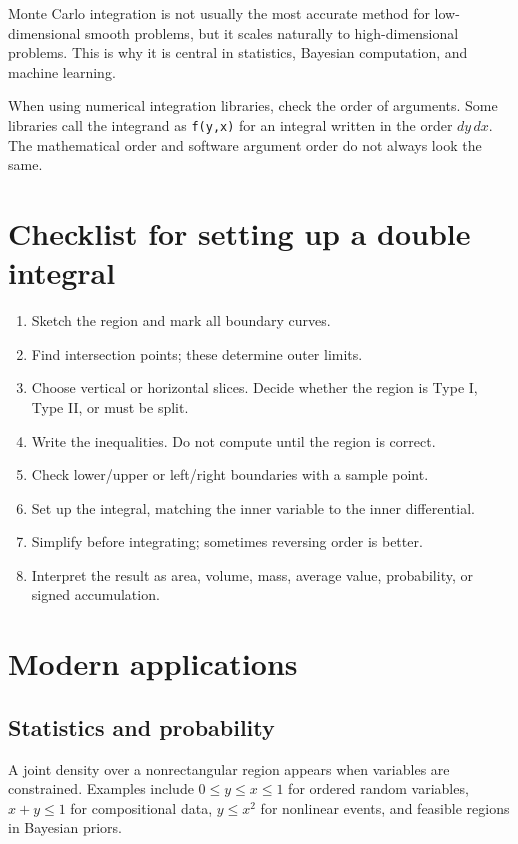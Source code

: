 \documentclass[11pt]{article}
\begin{document}
Monte Carlo integration is not usually the most accurate method for low-dimensional smooth problems, but it scales naturally to high-dimensional problems. This is why it is central in statistics, Bayesian computation, and machine learning.

\begin{warningbox}
When using numerical integration libraries, check the order of arguments. Some libraries call the integrand as \texttt{f(y,x)} for an integral written in the order $dy\,dx$. The mathematical order and software argument order do not always look the same.
\end{warningbox}

\section{Checklist for setting up a double integral}

\begin{enumerate}
  \item Sketch the region and mark all boundary curves.
  \item Find intersection points; these determine outer limits.
  \item Choose vertical or horizontal slices. Decide whether the region is Type I, Type II, or must be split.
  \item Write the inequalities. Do not compute until the region is correct.
  \item Check lower/upper or left/right boundaries with a sample point.
  \item Set up the integral, matching the inner variable to the inner differential.
  \item Simplify before integrating; sometimes reversing order is better.
  \item Interpret the result as area, volume, mass, average value, probability, or signed accumulation.
\end{enumerate}

\section{Modern applications}

\subsection*{Statistics and probability}
A joint density over a nonrectangular region appears when variables are constrained. Examples include $0\le y\le x\le 1$ for ordered random variables, $x+y\le 1$ for compositional data, $y\le x^2$ for nonlinear events, and feasible regions in Bayesian priors.
\end{document}
